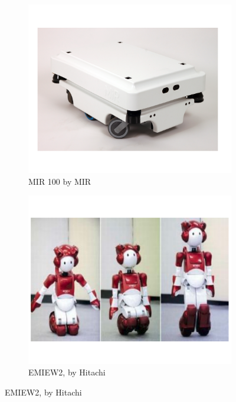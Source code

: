 \begin{figure}[h]
\begin{subfigure}[b]{0.32\textwidth}
        \includegraphics[width=\textwidth]{figures/mobile_mir.pdf}
        \caption{MIR 100 by MIR}
        \label{fig:mobile_mir}
    \end{subfigure}
    \centering
    \begin{subfigure}[b]{0.32\textwidth}
        \includegraphics[width=\textwidth]{figures/mobile_hitachi.pdf}
        \caption{EMIEW2, by Hitachi}
        \label{fig:mobile_hitachi}
    \end{subfigure}
\end{figure}

